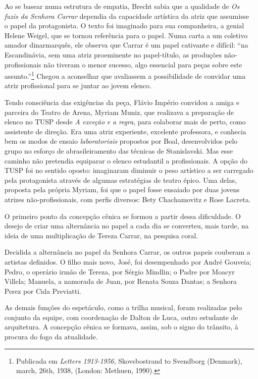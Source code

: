 Ao se basear numa estrutura de empatia, Brecht sabia que a qualidade de
\textit{Os fuzis da Senhora Carrar} dependia da capacidade artística da
atriz que assumisse o papel da protagonista. O texto foi imaginado para
sua companheira, a genial Helene Weigel, que se tornou referência para o
papel. Numa carta a um coletivo amador dinarmarquês, ele observa que
Carrar é um papel cativante e difícil: “na Escandinávia, sem uma atriz
proeminente no papel-título, as produções não-profissionais não tiveram
o menor sucesso, algo essencial para peças sobre este
assunto.”\footnote{Publicada em \textit{Letters 1913-1956,} Skovsbostrand
  to Svendborg (Denmark), march, 26th, 1938, (London: Methuen, 1990).}
Chegou a aconselhar que avaliassem a possibilidade de convidar uma atriz
profissional para se juntar ao jovem elenco.

Tendo consciência das exigências da peça, Flávio Império convidou a
amiga e parceira do Teatro de Arena, Myriam Muniz, que realizava a
preparação de elenco no TUSP desde \textit{A exceção e a regra}, para
colaborar mais de perto, como assistente de direção. Era uma atriz
experiente, excelente professora, e conhecia bem os modos de ensaio
\textit{laboratoriais} propostos por Boal, desenvolvidos pelo grupo no
esforço de abrasileiramento das técnicas de Stanislavski. Mas esse
caminho não pretendia equiparar o elenco estudantil a profissionais. A
opção do TUSP foi no sentido oposto: imaginaram diminuir o peso
artístico a ser carregado pela protagonista através de algumas
estratégias de teatro épico. Uma delas, proposta pela própria Myriam,
foi que o papel fosse ensaiado por duas jovens atrizes
não-profissionais, com perfis diversos: Bety Chachamovitz e Rose
Lacreta.

O primeiro ponto da concepção cênica se formou a partir dessa
dificuldade. O desejo de criar uma alternância no papel a cada dia se
converteu, mais tarde, na ideia de uma multiplicação de Tereza Carrar,
na pesquisa coral.

Decidida a alternância no papel da Senhora Carrar, os outros papeis
couberam a artistas definidos. O filho mais novo, José, foi desempenhado
por André Gouveia; Pedro, o operário irmão de Tereza, por Sérgio
Mindlin; o Padre por Moacyr Villela; Manuela, a namorada de Juan, por
Renata Souza Dantas; a Senhora Perez por Cida Previatti.

As demais funções do espetáculo, como a trilha musical, foram realizadas
pelo conjunto da equipe, com coordenação de Dalton de Luca, outro
estudante de arquitetura. A concepção cênica se formava, assim, sob o
signo do trânsito, à procura do fogo da atualidade.

